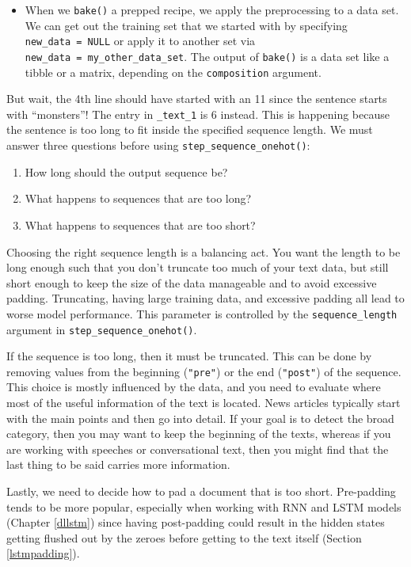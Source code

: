 \documentclass[
]{krantz}
\providecommand{\tightlist}{%
  \setlength{\itemsep}{0pt}\setlength{\parskip}{0pt}}
\newenvironment{rmdblock}[1]
  {\begin{shaded*}
  \begin{itemize}[left = -1cm, labelsep = 1cm]
  \renewcommand{\labelitemi}{
    \raisebox{-.7\height}[0pt][0pt]{
      {\setkeys{Gin}{width=3em,keepaspectratio}\texttt{[image: images/\#1]}}
    }
  }
 
  \item
  }
  {
  \end{itemize}
  \end{shaded*}
  }
\newenvironment{rmdwarning}
  {\begin{rmdblock}{warning}}
  {\end{rmdblock}}
\begin{document}
\begin{rmdwarning}
When we \texttt{bake()} a prepped recipe, we apply the preprocessing to
a data set. We can get out the training set that we started with by
specifying \texttt{new\_data\ =\ NULL} or apply it to another set via
\texttt{new\_data\ =\ my\_other\_data\_set}. The output of
\texttt{bake()} is a data set like a tibble or a matrix, depending on
the \texttt{composition} argument.
\end{rmdwarning}

But wait, the 4th line should have started with an 11 since the sentence starts with ``monsters''! The entry in \texttt{\_text\_1} is 6 instead. This is happening because the sentence is too long to fit inside the specified sequence length. We must answer three questions before using \texttt{step\_sequence\_onehot()}:

\begin{enumerate}
\def\labelenumi{\arabic{enumi}.}
\tightlist
\item
  How long should the output sequence be?
\item
  What happens to sequences that are too long?
\item
  What happens to sequences that are too short?
\end{enumerate}

Choosing the right sequence length is a balancing act. You want the length to be long enough such that you don't truncate too much of your text data, but still short enough to keep the size of the data manageable and to avoid excessive padding. Truncating, having large training data, and excessive padding all lead to worse model performance. This parameter is controlled by the \texttt{sequence\_length} argument in \texttt{step\_sequence\_onehot()}.

If the sequence is too long, then it must be truncated. This can be done by removing values from the beginning (\texttt{"pre"}) or the end (\texttt{"post"}) of the sequence. This choice is mostly influenced by the data, and you need to evaluate where most of the useful information of the text is located. News articles typically start with the main points and then go into detail. If your goal is to detect the broad category, then you may want to keep the beginning of the texts, whereas if you are working with speeches or conversational text, then you might find that the last thing to be said carries more information.

Lastly, we need to decide how to pad a document that is too short. Pre-padding tends to be more popular, especially when working with RNN and LSTM models (Chapter \ref{dllstm}) since having post-padding could result in the hidden states getting flushed out by the zeroes before getting to the text itself (Section \ref{lstmpadding}).
\end{document}
